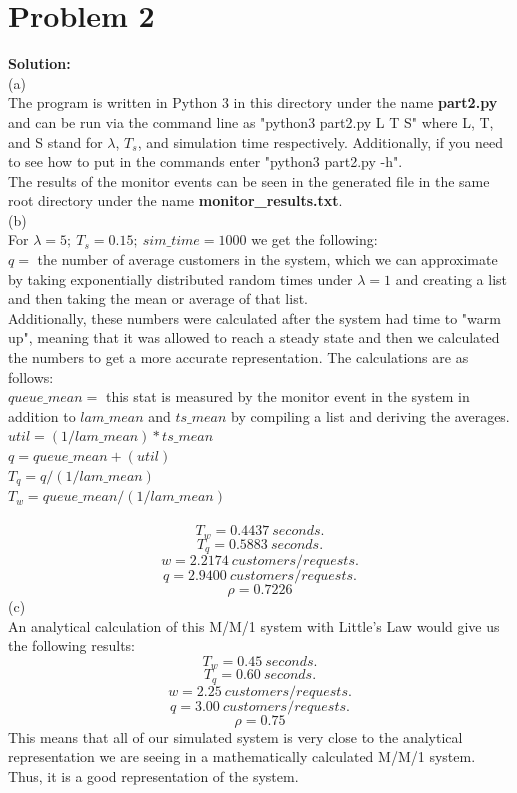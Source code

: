 \documentclass[letterpaper,11pt]{article}
\theoremstyle{mytheor}
\begin{document}
\section*{Problem 2}
\textbf{Solution:}\\
(a)\\
The program is written in Python 3 in this directory under the name \textbf{part2.py} and can be run via the command line as "python3 part2.py L T S" where L, T, and S stand for $\lambda$, $T_s$, and simulation time respectively. Additionally, if you need to see how to put in the commands enter "python3 part2.py -h".\\
The results of the monitor events can be seen in the generated file in the same root directory under the name \textbf{monitor\_results.txt}.\\
(b)\\
For $\lambda = 5;\ T_s = 0.15;\ sim\_time = 1000$ we get the following:\\
$q = $ the number of average customers in the system, which we can approximate by taking exponentially distributed random times under $\lambda = 1$ and creating a list and then taking the mean or average of that list.\\
Additionally, these numbers were calculated after the system had time to "warm up", meaning that it was allowed to reach a steady state and then we calculated the numbers to get a more accurate representation. The calculations are as follows:\\
$queue\_mean = $ this stat is measured by the monitor event in the system in addition to $lam\_mean$ and $ts\_mean$ by compiling a list and deriving the averages.\\
$util = (1 / lam\_mean) * ts\_mean$\\
$q = queue\_mean + (util)$\\
$T_q = q / (1 / lam\_mean)$\\
$T_w = queue\_mean / (1 / lam\_mean)$\\
\\
$$T_w = 0.4437\ seconds.$$
$$T_q = 0.5883\ seconds.$$
$$w = 2.2174\ customers/requests.$$
$$q = 2.9400\ customers/requests.$$
$$\rho = 0.7226$$
(c)\\
An analytical calculation of this M/M/1 system with Little's Law would give us the following results:\\
$$T_w = 0.45\ seconds.$$
$$T_q = 0.60\ seconds.$$
$$w = 2.25\ customers/requests.$$
$$q = 3.00\ customers/requests.$$
$$\rho = 0.75$$
This means that all of our simulated system is very close to the analytical representation we are seeing in a mathematically calculated M/M/1 system. Thus, it is a good representation of the system.\\
\end{document}
